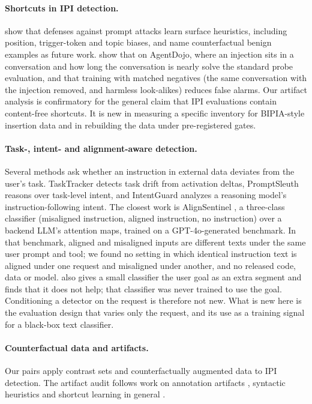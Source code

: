 \paragraph{Shortcuts in IPI detection.}
\citet{li2026surface} show that defenses against prompt attacks learn surface heuristics, including position,
trigger-token and topic biases, and name counterfactual benign examples as future work. \citet{kale2026probes} show
that on AgentDojo, where an injection sits in a conversation and how long the conversation is nearly solve the
standard probe evaluation, and that training with matched negatives (the same conversation with the injection
removed, and harmless look-alikes) reduces false alarms. Our artifact analysis is confirmatory for the general
claim that IPI evaluations contain content-free shortcuts. It is new in measuring a specific inventory for
BIPIA-style insertion data and in rebuilding the data under pre-registered gates.

\paragraph{Task-, intent- and alignment-aware detection.}
Several methods ask whether an instruction in external data deviates from the user's task. TaskTracker
\citep{abdelnabi2024drift} detects task drift from activation deltas, PromptSleuth \citep{wang2025promptsleuth}
reasons over task-level intent, and IntentGuard \citep{kang2025intentguard} analyzes a reasoning model's
instruction-following intent. The closest work is AlignSentinel \citep{jia2026alignsentinel}, a three-class
classifier (misaligned instruction, aligned instruction, no instruction) over a backend LLM's attention maps,
trained on a GPT-4o-generated benchmark. In that benchmark, aligned and misaligned inputs are different texts under
the same user prompt and tool; we found no setting in which identical instruction text is aligned under one request
and misaligned under another, and no released code, data or model. \citet{liu2026passing} also gives a small
classifier the user goal as an extra segment and finds that it does not help; that classifier was never trained to
use the goal. Conditioning a detector on the request is therefore not new. What is new here is the evaluation
design that varies only the request, and its use as a training signal for a black-box text classifier.

\paragraph{Counterfactual data and artifacts.}
Our pairs apply contrast sets \citep{gardner-etal-2020-evaluating} and counterfactually augmented data
\citep{kaushik2019counterfactual} to IPI detection. The artifact audit follows work on annotation artifacts
\citep{gururangan-etal-2018-annotation}, syntactic heuristics \citep{mccoy-etal-2019-right} and shortcut learning
in general \citep{geirhos2020shortcut}.

